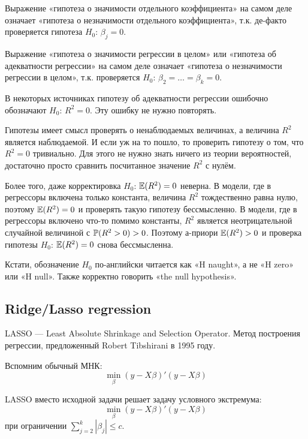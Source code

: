 \documentclass[12pt, a4paper]{article}\usepackage[]{graphicx}\usepackage[]{color}
\begin{document}
Выражение «гипотеза о значимости отдельного коэффициента» на самом деле означает «гипотеза о незначимости отдельного коэффициента», т.к. де-факто проверяется гипотеза $H_0$: $\beta_j=0$.

Выражение «гипотеза о значимости регрессии в целом» или «гипотеза об адекватности регрессии» на самом деле означает «гипотеза о незначимости регрессии в целом», т.к. проверяется $H_0$: $\beta_2=\ldots=\beta_k=0$.

В некоторых источниках гипотезу об адекватности регрессии ошибочно обозначают $H_0$: $R^2=0$. Эту ошибку не нужно повторять.

Гипотезы имеет смысл проверять о ненаблюдаемых величинах, а величина $R^2$ является наблюдаемой. И если уж на то пошло, то проверить гипотезу о том, что $R^2=0$ тривиально. Для этого не нужно знать ничего из теории вероятностей, достаточно просто сравнить посчитанное значение $R^2$ с нулём.

Более того, даже корректировка $H_0$: $\E(R^2)=0$ неверна. В модели, где в регрессоры включена только константа, величина $R^2$ тождественно равна нулю, поэтому $\E(R^2)=0$ и проверять такую гипотезу бессмысленно. В модели, где в регрессоры включено что-то помимо константы, $R^2$ является неотрицательной случайной величиной с $\P(R^2>0)>0$. Поэтому а-приори $\E(R^2)>0$ и проверка гипотезы $H_0$: $\E(R^2)=0$ снова бессмысленна.

Кстати, обозначение $H_0$ по-английски читается как «H naught», а не «H zero» или «H null». Также корректно говорить «the null hypothesis».


\subsection{Ridge/Lasso regression}

LASSO — Least Absolute Shrinkage and Selection Operator. Метод построения регрессии, предложенный Robert Tibshirani в 1995 году.

Вспомним обычный МНК:
\begin{equation}
\min_{\beta} (y-X\beta)'(y-X\beta)
\end{equation}


LASSO вместо исходной задачи решает задачу условного экстремума:
\begin{equation}
\min_{\beta} (y-X\beta)'(y-X\beta)
\end{equation}
при ограничении $\sum_{j=2}^{k}|\beta_j|\leq c$.

\end{document}
